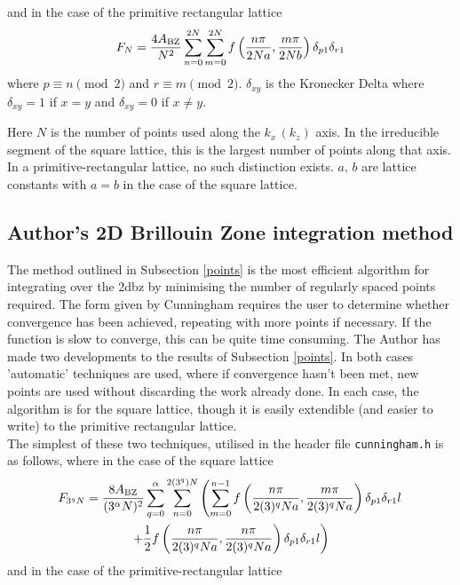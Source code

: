 \documentclass[a4paper, 12pt]{article}
\begin{document}
	and in the case of the primitive rectangular lattice
	\begin{equation}\label{CPrectangle}
		F_N =\frac{4A_{\rm BZ}}{N^2}\sum_{n=0}^{2N}\sum_{m=0}^{2N} f\left(\frac{n\pi}{2Na}, \frac{m\pi}{2Nb}\right)\delta_{p 1}\delta_{r 1}
	\end{equation}
	where $p \equiv n\pmod 2$ and $r \equiv m\pmod 2$. $\delta_{x y}$ is the Kronecker Delta where $\delta_{x y} = 1$ if $x=y$ and $\delta_{x y} = 0$ if $x\neq y$.
	\\\par Here $N$ is the number of points used along the $k_x\,(k_z)$ axis. In the irreducible segment of the square lattice, this is the largest number of points along that axis. In a primitive-rectangular lattice, no such distinction exists. $a,\,b$ are lattice constants with $a=b$ in the case of the square lattice.

	\subsection{Author's 2D Brillouin Zone integration method}
	\qquad The method outlined in Subsection \ref{points} is the most efficient algorithm for integrating over the \gls{2dbz} by minimising the number of regularly spaced points required. The form given by Cunningham requires the user to determine whether convergence has been achieved, repeating with more points if necessary. If the function is slow to converge, this can be quite time consuming. 
	The Author has made two developments to the results of Subsection \ref{points}. In both cases 'automatic' techniques are used, where if convergence hasn't been met, new points are used without discarding the work already done. In each case, the algorithm is for the square lattice, though it is easily extendible (and easier to write) to the primitive rectangular lattice. 
	\\[2mm]
	The simplest of these two techniques, utilised in the header file {\tt cunningham.h} is as follows, 
	where in the case of the square lattice
\begin{multline}\label{auto_square}
		F_{3^qN} =\frac{8A_{\rm BZ}}{(3^\alpha N)^2}\sum_{q=0}^\alpha\sum_{n=0}^{2(3^q)N}\left(\sum_{m=0}^{n-1} f\left(\frac{n\pi}{2(3)^qNa}, \frac{m\pi}{2(3)^qNa}\right)\delta_{p 1}\delta_{r 1}l\right.\\\left.+\frac{1}{2}f\left(\frac{n\pi}{2(3)^qNa}, \frac{n\pi}{2(3)^qNa}\right)\delta_{p 1}\delta_{r 1}l\right)
	\end{multline}
	and in the case of the primitive-rectangular lattice
\end{document}
